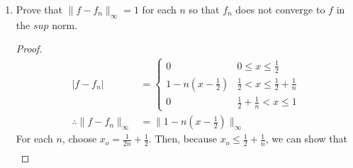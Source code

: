 \documentclass{article}
\begin{document}
\begin{enumerate}
\begin{enumerate}
\begin{proof}
\begin{align*}
                                                              & < \varepsilon.
                              \end{align*}
                              Therefore,
                              \[
                                    \frac{1}{2}< x \leq\frac{1}{2}
                              \]
                              This clearly cannot be true. Contradiction!
                              Thus,
                              \begin{align*}
                                    \frac{1}{2} + \frac{1}{n}< & x \leq 1 \\
                                    f_n(x)                     & = 0      \\
                                    f(x)                       & = 0      \\
                                    \therefore f_n(x)          & = f(x)
                              \end{align*}
                              Therefore, $f_n(x)\to f(x)$ pointwise.
                        \end{proof}
                  \item Prove that $\lVert f-f_n\rVert_\infty=1$ for each $n$ so
                        that $f_n$ does not converge to $f$ in the $sup$ norm.
                        \begin{proof}
                              \begin{align*}
                                    \lvert f-f_n\rvert                   & = \begin{cases}
                                          0                  & 0 \leq x \leq \frac{1}{2}                  \\
                                          1-n(x-\frac{1}{2}) & \frac{1}{2}<x \leq \frac{1}{2}+\frac{1}{n} \\
                                          0                  & \frac{1}{2}+\frac{1}{n} < x \leq 1
                                    \end{cases}             \\
                                    \therefore \lVert f-f_n\rVert_\infty & = \lVert 1-n(x-\frac{1}{2})\rVert_\infty
                              \end{align*}
                              For each $n$, choose $x_o=\frac{1}{2n}+\frac{1}{2}$. Then,
                              because $x_o\leq \frac{1}{2}+\frac{1}{n}$, we can show that
                              \begin{align*}

\end{align*}
\end{proof}
\end{enumerate}
\end{enumerate}
\end{document}

